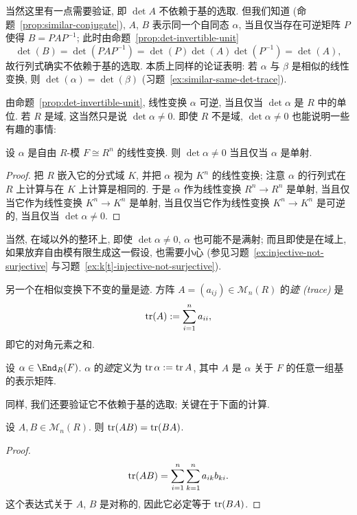 当然这里有一点需要验证, 即 $\det A$ 不依赖于基的选取. 但我们知道 (命题~\ref{prop:similar-conjugate}), $A$, $B$ 表示同一个自同态 $\alpha$, 当且仅当存在可逆矩阵 $P$ 使得 $B=PAP^{-1}$; 此时由命题~\ref{prop:det-invertible-unit}
\[
\det(B)=\det(PAP^{-1})=\det(P)\det(A)\det(P^{-1})=\det(A),
\]
故行列式确实不依赖于基的选取. 本质上同样的论证表明: 若 $\alpha$ 与 $\beta$ 是相似的线性变换, 则 $\det(\alpha)=\det(\beta)$ (习题~\ref{ex:similar-same-det-trace}).

由命题~\ref{prop:det-invertible-unit}, 线性变换 $\alpha$ 可逆, 当且仅当 $\det\alpha$ 是 $R$ 中的单位. 若 $R$ 是域, 这当然只是说 $\det\alpha\neq0$. 即使 $R$ 不是域, $\det\alpha\neq0$ 也能说明一些有趣的事情:

\begin{proposition}\label{prop:det-injective}
设 $\alpha$ 是自由 $R$-模 $F\cong R^n$ 的线性变换. 则 $\det\alpha\neq0$ 当且仅当 $\alpha$ 是单射.
\end{proposition}

\begin{proof}
把 $R$ 嵌入它的分式域 $K$, 并把 $\alpha$ 视为 $K^n$ 的线性变换; 注意 $\alpha$ 的行列式在 $R$ 上计算与在 $K$ 上计算是相同的. 于是 $\alpha$ 作为线性变换 $R^n\to R^n$ 是单射, 当且仅当它作为线性变换 $K^n\to K^n$ 是单射, 当且仅当它作为线性变换 $K^n\to K^n$ 是可逆的, 当且仅当 $\det\alpha\neq0$.
\end{proof}

当然, 在域以外的整环上, 即使 $\det\alpha\neq0$, $\alpha$ 也可能不是满射; 而且即使是在域上, 如果放弃自由模有限生成这一假设, 也需要小心 (参见习题~\ref{ex:injective-not-surjective} 与习题~\ref{ex:k[t]-injective-not-surjective}).

另一个在相似变换下不变的量是迹. 方阵 $A=(a_{ij})\in\mathcal{M}_n(R)$ 的\emph{迹 (trace)}
是
\[
\operatorname{tr}(A):=\sum_{i=1}^n a_{ii},
\]
即它的对角元素之和.

\begin{definition}\label{def:trace-endomorphism}
设 $\alpha\in\End_R(F)$. $\alpha$ 的\emph{迹}定义为 $\operatorname{tr}\alpha:=\operatorname{tr} A$, 其中 $A$ 是 $\alpha$ 关于 $F$ 的任意一组基的表示矩阵.
\end{definition}

同样, 我们还要验证它不依赖于基的选取; 关键在于下面的计算.

\begin{lemma}\label{lem:trace-of-product}
设 $A,B\in\mathcal{M}_n(R)$. 则 $\operatorname{tr}(AB)=\operatorname{tr}(BA)$.
\end{lemma}

\begin{proof}
\[
\operatorname{tr}(AB)=\sum_{i=1}^n\sum_{k=1}^n a_{ik}b_{ki}.
\]
这个表达式关于 $A$, $B$ 是对称的, 因此它必定等于 $\operatorname{tr}(BA)$.
\end{proof}

